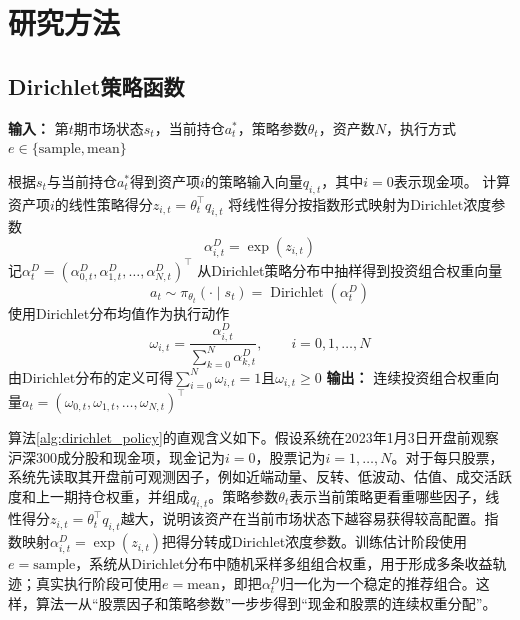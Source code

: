 \section{研究方法}
\subsection{Dirichlet策略函数}

\begin{algorithm}[H]
\caption{Dirichlet策略函数抽取投资组合}
\label{alg:dirichlet_policy}
\begin{algorithmic}[1]
\STATE \textbf{输入：} 第$t$期市场状态$s_t$，当前持仓$a_{t}^*$，策略参数$\theta_t$，资产数$N$，执行方式$e\in\{\mathrm{sample},\mathrm{mean}\}$

    \STATE 根据$s_t$与当前持仓$a_t^*$得到资产项$i$的策略输入向量$q_{i,t}$，其中$i=0$表示现金项。
    \STATE 计算资产项$i$的线性策略得分$z_{i,t}=\theta_t^\top q_{i,t}$
    \STATE 将线性得分按指数形式映射为Dirichlet浓度参数
    \begin{equation*}
    \alpha^D_{i,t}
    =
    \exp(z_{i,t})
    \end{equation*}
\ENDFOR
\STATE 记$\alpha^D_t=(\alpha^D_{0,t},\alpha^D_{1,t},\dots,\alpha^D_{N,t})^\top$
    \STATE 从Dirichlet策略分布中抽样得到投资组合权重向量
\begin{equation*}
a_t
\sim
\pi_{\theta_t}(\cdot\mid s_t)
=
\operatorname{Dirichlet}(\alpha^D_t)
\end{equation*}
\ELSE
    \STATE 使用Dirichlet分布均值作为执行动作
\begin{equation*}
\omega_{i,t}
=
\frac{\alpha^D_{i,t}}{\sum_{k=0}^{N}\alpha^D_{k,t}},
\qquad
i=0,1,\dots,N
\end{equation*}
\ENDIF
\STATE 由Dirichlet分布的定义可得$\sum_{i=0}^{N}\omega_{i,t}=1$且$\omega_{i,t}\ge 0$
\STATE \textbf{输出：} 连续投资组合权重向量$a_t=(\omega_{0,t},\omega_{1,t},\dots,\omega_{N,t})^\top$
\end{algorithmic}
\end{algorithm}

算法\ref{alg:dirichlet_policy}的直观含义如下。假设系统在2023年1月3日开盘前观察沪深300成分股和现金项，现金记为$i=0$，股票记为$i=1,\dots,N$。对于每只股票，系统先读取其开盘前可观测因子，例如近端动量、反转、低波动、估值、成交活跃度和上一期持仓权重，并组成$q_{i,t}$。策略参数$\theta_t$表示当前策略更看重哪些因子，线性得分$z_{i,t}=\theta_t^\top q_{i,t}$越大，说明该资产在当前市场状态下越容易获得较高配置。指数映射$\alpha^D_{i,t}=\exp(z_{i,t})$把得分转成Dirichlet浓度参数。训练估计阶段使用$e=\mathrm{sample}$，系统从Dirichlet分布中随机采样多组组合权重，用于形成多条收益轨迹；真实执行阶段可使用$e=\mathrm{mean}$，即把$\alpha^D_t$归一化为一个稳定的推荐组合。这样，算法一从“股票因子和策略参数”一步步得到“现金和股票的连续权重分配”。

